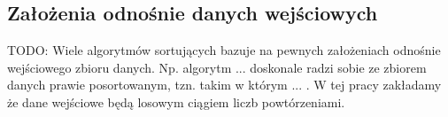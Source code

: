 \subsection{Założenia odnośnie danych wejściowych}
TODO: Wiele algorytmów sortujących bazuje na pewnych założeniach odnośnie wejściowego zbioru danych.
Np. algorytm ... doskonale radzi sobie ze zbiorem danych prawie posortowanym, tzn.
takim w którym ... . W tej pracy zakładamy że dane wejściowe będą losowym ciągiem liczb powtórzeniami.
